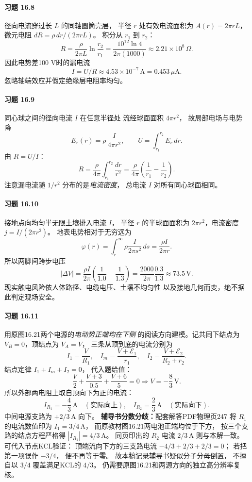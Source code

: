 \paragraph{习题 16.8}
径向电流穿过长 \(L\) 的同轴圆筒壳层，
半径 \(r\) 处有效电流面积为
\(A(r)=2\pi rL\)，
微元电阻
\(dR=\rho\,dr/(2\pi rL)\)。
积分从 \(r_1\) 到 \(r_2\)：
\[
 \boxed{R=\frac{\rho}{2\pi L}
 \ln\frac{r_2}{r_1}
 =\frac{10^{12}\ln4}{2\pi(1000)}
 \approx2.21\times10^8\,\Omega}.
\]
因此电势差100 V时的漏电流
\[
 \boxed{I=U/R\approx4.53\times10^{-7}\,\mathrm A
 =0.453\,\mu\mathrm A}.
\]
忽略轴端效应并假定绝缘层电阻率均匀。

\paragraph{习题 16.9}
同心球之间的径向电流 \(I\) 在任意半径处
流经球面面积 \(4\pi r^2\)，
故局部电场与电势降
\[
 E_r(r)=\rho\,\frac I{4\pi r^2},\qquad
 U=\int_{r_1}^{r_2}E_r\,dr.
\]
由 \(R=U/I\)：
\[
 \boxed{R=\frac{\rho}{4\pi}
 \int_{r_1}^{r_2}\frac{dr}{r^2}
 =\frac{\rho}{4\pi}\left(
 \frac1{r_1}-\frac1{r_2}\right)}.
\]
注意漏电流随 \(1/r^2\) 分布的是\emph{电流密度}，
总电流 \(I\) 对所有同心球面相同。

\paragraph{习题 16.10}
接地点向均匀半无限土壤排入电流 \(I\)，
半径 \(r\) 的半球面面积为
\(2\pi r^2\)，电流密度
\(j=I/(2\pi r^2)\)。
地表电势相对于无穷远为
\[
 \varphi(r)=\int_r^\infty\rho\frac I{2\pi s^2}\,ds
 =\frac{\rho I}{2\pi r}.
\]
所以两脚间跨步电压
\[
 \boxed{|\Delta V|=
 \frac{\rho I}{2\pi}\left(\frac1{1.0}-\frac1{1.3}\right)
 =\frac{2000}{2\pi}\frac{0.3}{1.3}
 \approx73.5\,\mathrm V}.
\]
现实触电风险依人体路径、电缆电压、土壤不均匀性
以及接地几何而变，绝不据此判定现场安全。

\paragraph{习题 16.11}
用原图16.21两个电源的\emph{电动势正端均在下侧}
的阅读方向建模。记共同下结点为
\(V_B=0\)，顶结点为 \(V_A=V\)，
三条从顶到底的电流分别为
\[
 I_1=\frac V{R_1},\quad
 I_m=\frac{V+\mathcal E_1}{r_1},\quad
 I_2=\frac{V+\mathcal E_2}{R_2+r_2}.
\]
结点定律
\(I_1+I_m+I_2=0\)，
代入题给值：
\[
 \frac V2+\frac{V+3}{0.5}
 +\frac{V+6}{5}=0
 \Longrightarrow V=-\frac83\,\mathrm V.
\]
所以外部两电阻上取自顶向下为正的电流：
\[
 \boxed{I_{R_1}=-\frac43\,\mathrm A
 \quad(\text{实际向上})},\quad
 \boxed{I_{R_2}=\frac23\,\mathrm A
 \quad(\text{实际向下})}.
\]
中间电源支路为 \(+2/3\,\mathrm A\) 向下。
\textbf{辅导书分数分歧：}配套解答PDF物理页247
将 \(R_1\) 的电流数值印为
\(I_1=3/4\,\mathrm A\)，
而原教材图16.21两电池正端均位于下方，
按三个支路的结点方程严格得
\(|I_{R_1}|=4/3\,\mathrm A\)。
同页印出的 \(R_2\) 电流 \(2/3\,\mathrm A\)
则与本解一致。
可代入节点KCL验证：
顶端流向下方的三支路电流
\(-4/3+2/3+2/3=0\)；
若把第一项误作 \(-3/4\)，
便不再等于零。
故本稿记录辅导书疑似分子分母倒置，
不擅自以 \(3/4\) 覆盖满足KCL的 \(4/3\)。
仍需要原图16.21和两源方向的独立高分辨率复核。

